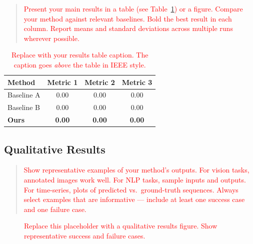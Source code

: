 \documentclass[journal, 10pt, twoside]{IEEEtran}
\begin{document}
\begin{quote}
  \textcolor{red}{%
    Present your main results in a table (see Table~\ref{tab:results}) or a figure.  Compare your method against relevant baselines. Bold the best result in each column.  Report means and standard deviations across multiple runs wherever possible.%
  }
\end{quote}

\begin{table}[t]
  \centering
  \caption{%
    \textcolor{red}{Replace with your results table caption.  The caption goes \emph{above} the table in IEEE style.}%
  }
  \label{tab:results}
  \begin{tabular}{lccc}
    \toprule
    \textbf{Method} & \textbf{Metric 1} & \textbf{Metric 2} & \textbf{Metric 3} \\
    \midrule
    Baseline A      & 0.00 & 0.00 & 0.00 \\
    Baseline B      & 0.00 & 0.00 & 0.00 \\
    \textbf{Ours}   & \textbf{0.00} & \textbf{0.00} & \textbf{0.00} \\
    \bottomrule
  \end{tabular}
\end{table}

\subsection{Qualitative Results}
\label{ssec:qual}

\begin{quote}
  \textcolor{red}{%
    Show representative examples of your method's outputs.  For vision tasks, annotated images work well.  For NLP tasks, sample inputs and outputs.  For time-series, plots of predicted vs.\
    ground-truth sequences.  Always select examples that are informative --- include at least one success case and one failure case.%
  }
\end{quote}

\begin{figure}[t]
  \centering
  \fbox{\rule{0pt}{3cm}\rule{\columnwidth}{0pt}} %
  \caption{\textcolor{red}{Replace this placeholder with a qualitative results figure.  Show representative success and failure cases.}}
  \label{fig:qualitative}
\end{figure}
\end{document}
